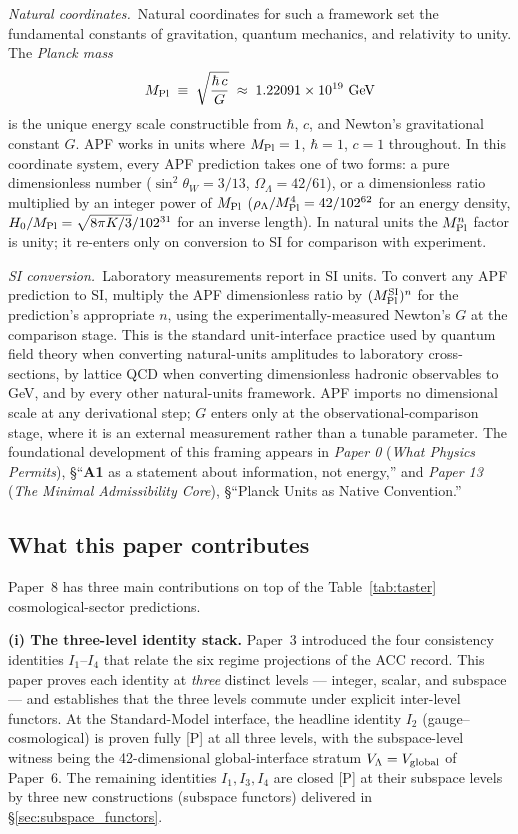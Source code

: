 \documentclass[11pt]{article}
\newcommand{\paperref}[2]{\emph{Paper #1} (\emph{#2})}
\newcommand{\Aone}{\textbf{A1}}
\newcommand{\Mpl}{M_{\rm Pl}}
\begin{document}
\textit{Natural coordinates.}\ Natural coordinates for such a framework set the fundamental constants of gravitation, quantum mechanics, and relativity to unity. The \emph{Planck mass}
\[
\Mpl \;\equiv\; \sqrt{\frac{\hbar\,c}{G}} \;\approx\; 1.22091 \times 10^{19}\ \mathrm{GeV}
\]
is the unique energy scale constructible from $\hbar$, $c$, and Newton's gravitational constant $G$. APF works in units where $\Mpl = 1$, $\hbar = 1$, $c = 1$ throughout. In this coordinate system, every APF prediction takes one of two forms: a pure dimensionless number ($\sin^2\theta_W = 3/13$, $\Omega_\Lambda = 42/61$), or a dimensionless ratio multiplied by an integer power of $\Mpl$ ($\rho_\Lambda/\Mpl^4 = 42/102^{62}$ for an energy density, $H_0/\Mpl = \sqrt{8\pi K/3}/102^{31}$ for an inverse length). In natural units the $\Mpl^n$ factor is unity; it re-enters only on conversion to SI for comparison with experiment.

\textit{SI conversion.}\ Laboratory measurements report in SI units. To convert any APF prediction to SI, multiply the APF dimensionless ratio by $(\Mpl^{\rm SI})^n$ for the prediction's appropriate $n$, using the experimentally-measured Newton's $G$ at the comparison stage. This is the standard unit-interface practice used by quantum field theory when converting natural-units amplitudes to laboratory cross-sections, by lattice QCD when converting dimensionless hadronic observables to GeV, and by every other natural-units framework. APF imports no dimensional scale at any derivational step; $G$ enters only at the observational-comparison stage, where it is an external measurement rather than a tunable parameter. The foundational development of this framing appears in \paperref{0}{What Physics Permits}, \S``\Aone{} as a statement about information, not energy,'' and \paperref{13}{The Minimal Admissibility Core}, \S``Planck Units as Native Convention.''

\subsection{What this paper contributes}\label{sec:intro_contribution}

Paper~8 has three main contributions on top of the Table~\ref{tab:taster} cosmological-sector predictions.

\smallskip
\noindent\textbf{(i) The three-level identity stack.} Paper~3 introduced the four consistency identities $I_1$--$I_4$ that relate the six regime projections of the ACC record. This paper proves each identity at \emph{three} distinct levels --- integer, scalar, and subspace --- and establishes that the three levels commute under explicit inter-level functors. At the Standard-Model interface, the headline identity $I_2$ (gauge--cosmological) is proven fully [P] at all three levels, with the subspace-level witness being the 42-dimensional global-interface stratum $V_\Lambda = V_{\rm global}$ of Paper~6. The remaining identities $I_1, I_3, I_4$ are closed [P] at their subspace levels by three new constructions (subspace functors) delivered in \S\ref{sec:subspace_functors}.
\end{document}
